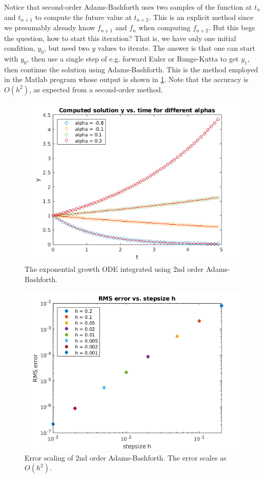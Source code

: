 \documentclass[hidelinks,notitlepage]{book}
\begin{document}
Notice that second-order Adams-Bashforth uses two samples of the function at $t_n$ and $t_{n+1}$ to compute the future value at $t_{n+2}$.  This is an explicit method since we presumably already know $f_{n+1}$ and $f_n$ when computing $f_{n+2}$.  But this begs the question, how to start this iteration?  That is, we have only one initial condition, $y_0$, but need two $y$ values to iterate.  The answer is that one can start with $y_0$, then use a single step of e.g. forward Euler or Runge-Kutta to get $y_1$, then continue the solution using Adams-Bashforth.  This is the method employed in the Matlab program whose output is shown in \cref{fig:AdamsBashforth2Exponential}.  Note that the accuracy is $O(h^2)$, as expected from a second-order method.
\begin{figure}[tbh]
	\centering
	\includegraphics[width=0.7\columnwidth]{AdamsBashforth2Exponential.png}
	\caption{The exponential growth ODE integrated using 2nd order Adams-Bashforth.}
	\label{fig:AdamsBashforth2Exponential}
\end{figure}
\begin{figure}[tbh]
	\centering
	\includegraphics[width=0.7\columnwidth]{AdamsBashforth2ExponentialErr.png}
	\caption{Error scaling of 2nd order Adams-Bashforth.  The error scales as $O(h^2)$.}
	\label{fig:AdamsBashforth2ExponentialErr}
\end{figure}
\end{document}
